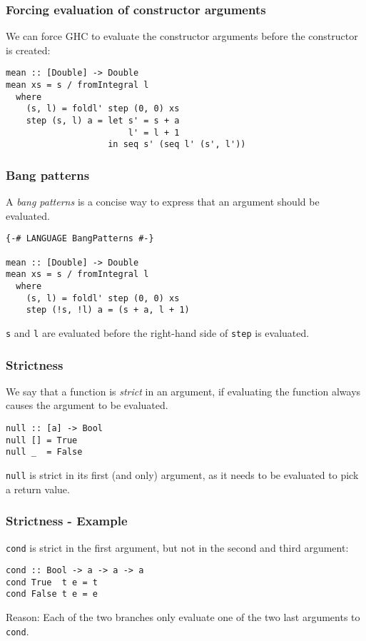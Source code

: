 \documentclass{beamer}
\begin{document}
\begin{frame}[fragile]
  \frametitle{Forcing evaluation of constructor arguments}

  We can force GHC to evaluate the constructor arguments before the
  constructor is created:

  \begin{lstlisting}
mean :: [Double] -> Double
mean xs = s / fromIntegral l
  where
    (s, l) = foldl' step (0, 0) xs
    step (s, l) a = let s' = s + a
                        l' = l + 1
                    in seq s' (seq l' (s', l'))
  \end{lstlisting}
\end{frame}

\begin{frame}[fragile]
  \frametitle{Bang patterns}

  A \emph{bang patterns} is a concise way to express that an argument
  should be evaluated.

  \begin{lstlisting}
{-# LANGUAGE BangPatterns #-}

mean :: [Double] -> Double
mean xs = s / fromIntegral l
  where
    (s, l) = foldl' step (0, 0) xs
    step (!s, !l) a = (s + a, l + 1)
  \end{lstlisting}

  \lstinline!s! and \lstinline!l! are evaluated before the right-hand
  side of \lstinline!step! is evaluated.
\end{frame}

\begin{frame}[fragile]
  \frametitle{Strictness}

  We say that a function is \emph{strict} in an argument, if
  evaluating the function always causes the argument to be evaluated.

  \begin{lstlisting}
null :: [a] -> Bool
null [] = True
null _  = False
  \end{lstlisting}

  \lstinline!null! is strict in its first (and only) argument, as it
  needs to be evaluated to pick a return value.
\end{frame}

\begin{frame}[fragile]
  \frametitle{Strictness - Example}

  \lstinline!cond! is strict in the first argument, but not in the
  second and third argument:
  \begin{lstlisting}
cond :: Bool -> a -> a -> a
cond True  t e = t
cond False t e = e
  \end{lstlisting}
  Reason: Each of the two branches only evaluate one of the two last
  arguments to \lstinline!cond!.
\end{frame}
\end{document}
